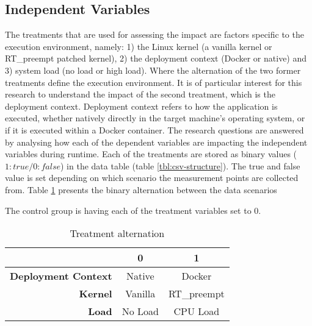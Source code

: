 
\subsection{Independent Variables} \label{section:independent}
The treatments that are used for assessing the impact are factors specific to the execution environment, namely: 1) the Linux kernel (a vanilla kernel or RT\_preempt patched kernel), 2) the deployment context (Docker or native) and 3) system load (no load or high load). Where the alternation of the two former treatments define the execution environment. It is of particular interest for this research to understand the impact of the second treatment, which is the deployment context. Deployment context refers to how the application is executed, whether natively directly in the target machine's operating system, or if it is executed within a Docker container. The research questions are answered by analysing how each of the dependent variables are impacting the independent variables during runtime. Each of the treatments are stored as binary values ($1:true/0:false$) in the data table (table \ref{tbl:csv-structure}). The true and false value is set depending on which scenario the measurement points are collected from. Table \ref{table:treat-alt} presents the binary alternation between the data scenarios

The control group is having each of the treatment variables set to $0$.

\begin{table}[ht]
\centering
\caption{Treatment alternation}
\label{table:treat-alt}
\renewcommand{\arraystretch}{1.2}
\begin{tabular}{|r|c|c|} \hline
							& \textbf{0}& \textbf{1}	\\ \hline
\textbf{Deployment Context}	& Native 	& Docker 		\\
\textbf{Kernel}				& Vanilla 	& RT\_preempt 	\\
\textbf{Load}				& No Load 	& CPU Load 		\\ \hline

\end{tabular}
\end{table}



